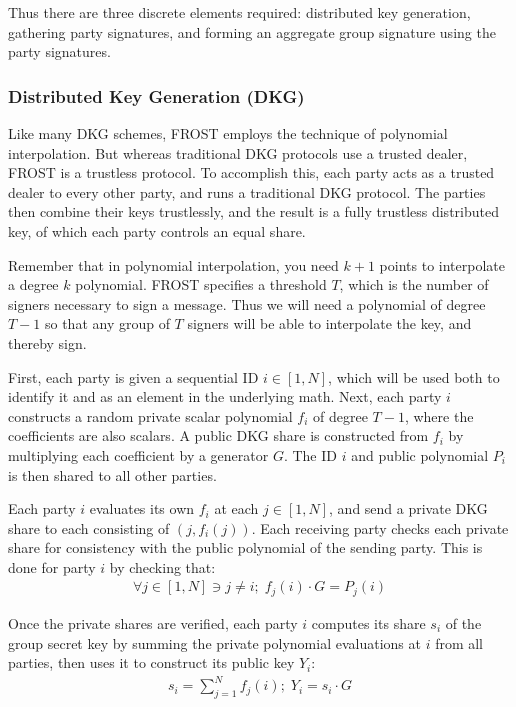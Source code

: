 \documentclass{article}
\begin{document}
Thus there are three discrete elements required: distributed key generation, gathering party signatures, and forming an aggregate group signature using the party signatures.

\subsubsection{
  Distributed Key Generation (DKG)
}

Like many DKG schemes, FROST employs the technique of polynomial interpolation.  But whereas traditional DKG protocols use a trusted dealer, FROST is a trustless protocol.  To accomplish this, each party acts as a trusted dealer to every other party, and runs a traditional DKG protocol.  The parties then combine their keys trustlessly, and the result is a fully trustless distributed key, of which each party controls an equal share.

Remember that in polynomial interpolation, you need $k+1$ points to interpolate a degree $k$ polynomial.  FROST specifies a threshold $T$, which is the number of signers necessary to sign a message.  Thus we will need a polynomial of degree $T-1$ so that any group of $T$ signers will be able to interpolate the key, and thereby sign.

First, each party is given a sequential ID $i \in [1, N]$, which will be used both to identify it and as an element in the underlying math.  Next, each party $i$ constructs a random private scalar polynomial $f_i$ of degree $T-1$, where the coefficients are also scalars.  A public DKG share is constructed from $f_i$ by multiplying each coefficient by a generator $G$.  The ID $i$ and public polynomial $P_i$ is then shared to all other parties.

Each party $i$ evaluates its own $f_i$ at each $j \in [1,N]$, and send a private DKG share to each consisting of $(j, f_i(j))$.  Each receiving party checks each private share for consistency with the public polynomial of the sending party.  This is done for party $i$ by checking that:
\begin{align}
  \forall j \in [1,N] \ni j \neq i;\;f_j(i) \cdot G = P_j(i)
\end{align}

Once the private shares are verified, each party $i$ computes its share $s_i$ of the group secret key by summing the private polynomial evaluations at $i$ from all parties, then uses it to construct its public key $Y_i$:
\begin{align}
  s_i = \sum_{j=1}^{N} f_j(i) ;\; Y_i = s_i \cdot G
\end{align}
\end{document}
